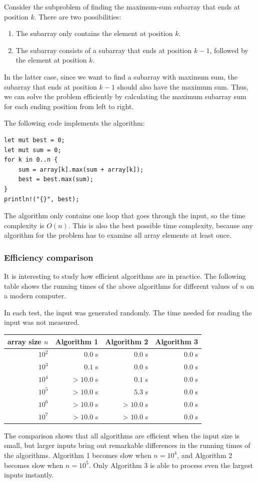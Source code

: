 Consider the subproblem of finding the maximum-sum subarray
that ends at position $k$.
There are two possibilities:
\begin{enumerate}
\item The subarray only contains the element at position $k$.
\item The subarray consists of a subarray that ends
at position $k-1$, followed by the element at position $k$.
\end{enumerate}

In the latter case, since we want to
find a subarray with maximum sum,
the subarray that ends at position $k-1$
should also have the maximum sum.
Thus, we can solve the problem efficiently
by calculating the maximum subarray sum
for each ending position from left to right.

The following code implements the algorithm:
\begin{lstlisting}
let mut best = 0;
let mut sum = 0;
for k in 0..n {
    sum = array[k].max(sum + array[k]);
    best = best.max(sum);
}
println!("{}", best);
\end{lstlisting}

The algorithm only contains one loop
that goes through the input,
so the time complexity is $O(n)$.
This is also the best possible time complexity,
because any algorithm for the problem
has to examine all array elements at least once.

\subsubsection{Efficiency comparison}

It is interesting to study how efficient 
algorithms are in practice.
The following table shows the running times
of the above algorithms for different
values of $n$ on a modern computer.

In each test, the input was generated randomly.
The time needed for reading the input was not
measured.

\begin{center}
\begin{tabular}{rrrr}
array size $n$ & Algorithm 1 & Algorithm 2 & Algorithm 3 \\
\hline
$10^2$ & $0.0$ s & $0.0$ s & $0.0$ s \\
$10^3$ & $0.1$ s & $0.0$ s & $0.0$ s \\
$10^4$ & > $10.0$ s & $0.1$ s & $0.0$ s \\
$10^5$ & > $10.0$ s & $5.3$ s & $0.0$ s \\
$10^6$ & > $10.0$ s & > $10.0$ s & $0.0$ s \\
$10^7$ & > $10.0$ s & > $10.0$ s & $0.0$ s \\
\end{tabular}
\end{center}

The comparison shows that all algorithms
are efficient when the input size is small,
but larger inputs bring out remarkable
differences in the running times of the algorithms.
Algorithm 1 becomes slow
when $n=10^4$, and Algorithm 2
becomes slow when $n=10^5$.
Only Algorithm 3 is able to process
even the largest inputs instantly.
